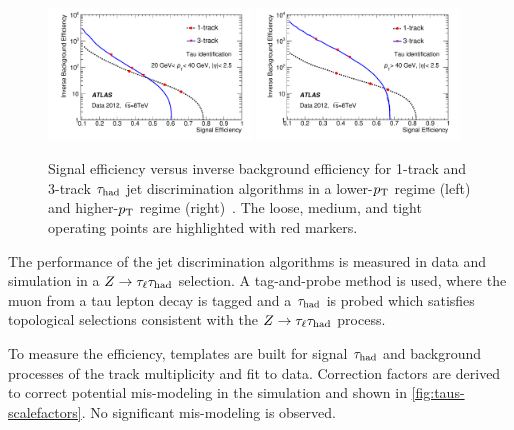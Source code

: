 \begin{figure}[tp]
  \centering
  \includegraphics[width=0.48\textwidth]{figures/PERF-2013-06/fig_05a}
  \includegraphics[width=0.48\textwidth]{figures/PERF-2013-06/fig_05b}
  \caption{Signal efficiency versus inverse background efficiency for 1-track and 3-track $\tau_\text{had}$ jet discrimination algorithms in a lower-$p_{\mathrm{T}}$ regime (left) and higher-$p_{\mathrm{T}}$ regime (right)~\cite{PERF-2013-06}. The loose, medium, and tight operating points are highlighted with red markers.}
  \label{fig:taus-idroc}
\end{figure}

The performance of the jet discrimination algorithms is measured in data and simulation in a $Z\rightarrow\tau_\ell\tau_\text{had}$ selection. A tag-and-probe method is used, where the muon from a tau lepton decay is tagged and a $\tau_\text{had}$ is probed which satisfies topological selections consistent with the $Z\rightarrow\tau_\ell\tau_\text{had}$ process. 

To measure the efficiency, templates are built for signal $\tau_\text{had}$ and background processes of the track multiplicity and fit to data. Correction factors are derived to correct potential mis-modeling in the simulation and shown in \cref{fig:taus-scalefactors}. No significant mis-modeling is observed.

